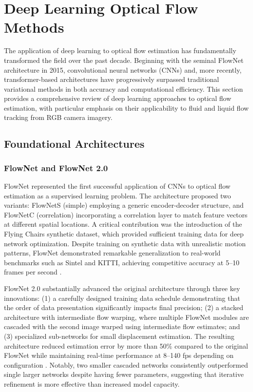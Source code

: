 \section{Deep Learning Optical Flow Methods}
\label{sec:deep_learning_flow}

The application of deep learning to optical flow estimation has fundamentally transformed the field over the past decade. Beginning with the seminal FlowNet architecture in 2015, convolutional neural networks (CNNs) and, more recently, transformer-based architectures have progressively surpassed traditional variational methods in both accuracy and computational efficiency. This section provides a comprehensive review of deep learning approaches to optical flow estimation, with particular emphasis on their applicability to fluid and liquid flow tracking from RGB camera imagery.

\subsection{Foundational Architectures}

\subsubsection{FlowNet and FlowNet 2.0}

FlowNet \cite{dosovitskiy2015flownet} represented the first successful application of CNNs to optical flow estimation as a supervised learning problem. The architecture proposed two variants: FlowNetS (simple) employing a generic encoder-decoder structure, and FlowNetC (correlation) incorporating a correlation layer to match feature vectors at different spatial locations. A critical contribution was the introduction of the Flying Chairs synthetic dataset, which provided sufficient training data for deep network optimization. Despite training on synthetic data with unrealistic motion patterns, FlowNet demonstrated remarkable generalization to real-world benchmarks such as Sintel and KITTI, achieving competitive accuracy at 5--10 frames per second \cite{dosovitskiy2015flownet}.

FlowNet 2.0 \cite{ilg2017flownet2} substantially advanced the original architecture through three key innovations: (1) a carefully designed training data schedule demonstrating that the order of data presentation significantly impacts final precision; (2) a stacked architecture with intermediate flow warping, where multiple FlowNet modules are cascaded with the second image warped using intermediate flow estimates; and (3) specialized sub-networks for small displacement estimation. The resulting architecture reduced estimation error by more than 50\% compared to the original FlowNet while maintaining real-time performance at 8--140 fps depending on configuration \cite{ilg2017flownet2}. Notably, two smaller cascaded networks consistently outperformed single larger networks despite having fewer parameters, suggesting that iterative refinement is more effective than increased model capacity.

